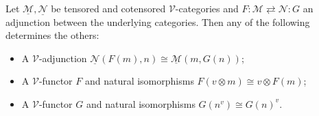 \begin{proposition}\label{prp:3.2}
	Let $\underline{\mathcal{M} } ,\underline{\mathcal{N} } $ be tensored and cotensored $\mathcal{V} $-categories and $F : \mathcal{M} \rightleftarrows \mathcal{N} : G$ an adjunction between the underlying categories. Then any of the following determines the others:
	\begin{itemize}
		\item A $\mathcal{V} $-adjunction $\underline{\mathcal{N} } (F(m),n)\cong \underline{\mathcal{M} } (m,G(n))$;
		\item A $\mathcal{V} $-functor $F$ and natural isomorphisms $F(v\otimes m)\cong v\otimes F(m)$;
		\item A $\mathcal{V} $-functor $G$ and natural isomorphisms $G(n^v)\cong G(n)^v$.
	\end{itemize}
\end{proposition}
